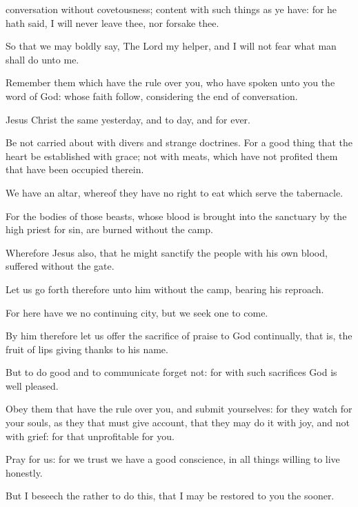 {
conversation
{} without
covetousness;
{}
content with such things as ye
have:
for
he hath
said, I
will
never
leave
thee,
nor
forsake
thee.

So
that
we
may
boldly
say, The
Lord
{}
my
helper,
and I
will
not
fear
what
man shall
do unto
me.


\par }{\PP {}Remember them which have the rule
over
you,
who have
spoken unto
you the
word of
God:
whose
faith
follow,
considering the
end
of
{}
conversation.

Jesus
Christ the
same
yesterday,
and to
day,
and
for
ever.

Be
not carried
about with
divers
and
strange
doctrines.
For
{} a good
thing
that the
heart be
established with
grace;
not with
meats,
which
have
not
profited them that have been
occupied
therein.

We
have an
altar,
whereof they
have
no
right to
eat which
serve the
tabernacle.

For the
bodies
of
those
beasts,
whose
blood is
brought
into the
sanctuary
by the high
priest
for
sin, are
burned
without the
camp.

Wherefore
Jesus
also,
that he might
sanctify the
people
with his
own
blood,
suffered
without the
gate.

Let us go
forth
therefore
unto
him
without the
camp,
bearing
his
reproach.

For
here have
we
no
continuing
city,
but we
seek one to
come.

By
him
therefore let us
offer the
sacrifice of
praise to
God
continually,
that
is, the
fruit
of
{}
lips giving
thanks
to
his
name.

But to do
good
and to
communicate
forget
not:
for with
such
sacrifices
God is well
pleased.

Obey them that have the rule
over
you,
and submit
yourselves:
for
they
watch
for
your
souls,
as they that must
give
account,
that they may
do
it
with
joy,
and
not with
grief:
for
that
{}
unprofitable for
you.


\par }{\PP {}Pray
for
us:
for we
trust we
have
a
good
conscience,
in all
things
willing to
live
honestly.

But I
beseech
{} the
rather to
do
this,
that I may be
restored to
you the
sooner.

}

